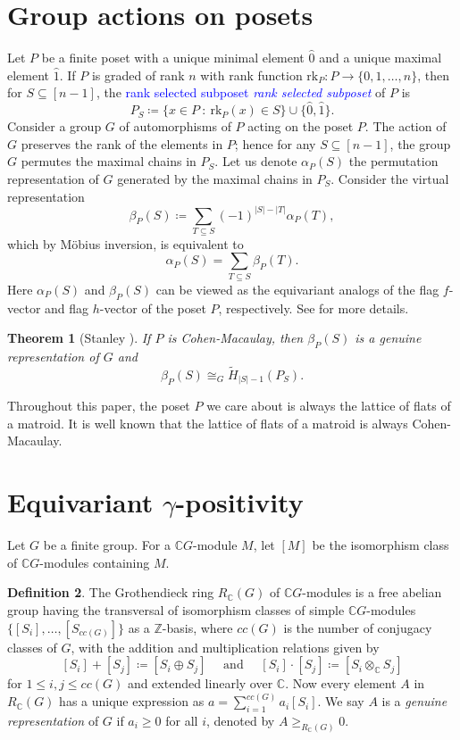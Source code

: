 \documentclass[reqno]{amsart}
\newcommand{\defin}[1]{%
\relax\ifmmode%
\textcolor{blue}{#1}%
\else\textcolor{blue}{\emph{#1}}%
\fi%
}
\newcommand{\rk}{{\mathrm{rk}}}
\newtheorem{thm}{Theorem}[section]
\theoremstyle{definition}
\newtheorem{defi}[thm]{Definition}
\theoremstyle{remark}
\begin{document}
\section{Group actions on posets}
Let $P$ be a finite poset with a unique minimal element $\hat{0}$ and a unique maximal element $\hat{1}$. If $P$ is graded of rank $n$ with rank function $\rk_P: P\longrightarrow\{0,1,\ldots,n\}$, then for $S\subseteq [n-1]$, the \defin{rank selected subposet} of $P$ is
\[
    P_S\coloneqq\{x\in P~:~\rk_P(x)\in S\}\cup\{\hat{0},\hat{1}\}.
\]
Consider a group $G$ of automorphisms of $P$ acting on the poset $P$. The action of $G$ preserves the rank of the elements in $P$; hence for any $S\subseteq [n-1]$, the group $G$ permutes the maximal chains in $P_S$. Let us denote $\alpha_P(S)$ the permutation representation of $G$ generated by the maximal chains in $P_S$. Consider the virtual representation
\[
    \beta_P(S)\coloneqq\sum_{T\subseteq S}(-1)^{|S|-|T|}\alpha_P(T),
\]
which by M\"{o}bius inversion, is equivalent to
\begin{equation} \label{eq: flagFtoH}
    \alpha_P(S)=\sum_{T\subseteq S}\beta_P(T).
\end{equation}
Here $\alpha_P(S)$ and $\beta_P(S)$ can be viewed as the equivariant analogs of the flag $f$-vector and flag $h$-vector of the poset $P$, respectively. See \cite[Section 3.13]{StanleyEC1} for more details.

\begin{thm}[Stanley \cite{Stanley1982GroupPoset}] \label{thm:BetaGenRep}
If $P$ is Cohen-Macaulay, then $\beta_P(S)$ is a genuine representation of $G$ and 
\[
    \beta_P(S)\cong_G \tilde{H}_{|S|-1}(P_S).
\]
\end{thm}
Throughout this paper, the poset $P$ we care about is always the lattice of flats of a matroid. It is well known that the lattice of flats of a matroid is always Cohen-Macaulay.



\section{Equivariant $\gamma$-positivity}\label{sec:EqGamma}

Let $G$ be a finite group. For a $\mathbb{C}G$-module $M$, let $[M]$ be the isomorphism class of $\mathbb{C}G$-modules containing $M$. 

\begin{defi}
The Grothendieck ring $R_{\mathbb{C}}(G)$ of $\mathbb{C}G$-modules is a free abelian group having the transversal of isomorphism classes of simple $\mathbb{C}G$-modules $\{[S_i],\ldots,[S_{cc(G)}]\}$ as a $\mathbb{Z}$-basis, where $cc(G)$ is the number of conjugacy classes of $G$, with the addition and multiplication relations given by 
\[
    [S_i]+[S_j]\coloneqq [S_i\oplus S_j] \quad  \text{ and } \quad  [S_i]\cdot[S_j]\coloneqq[S_i\otimes_{\mathbb{C}} S_j]
\]
for $1\le i,j\le cc(G)$ and extended linearly over $\mathbb{C}$. Now every element $A$ in $R_{\mathbb{C}}(G)$ has a unique expression as $a=\sum_{i=1}^{cc(G)}a_i[S_i]$. We say $A$ is a \emph{genuine representation} of $G$ if $a_i\ge 0$ for all $i$, denoted by $A\ge_{R_{\mathbb{C}}(G)}0$.
\end{defi}
\end{document}

